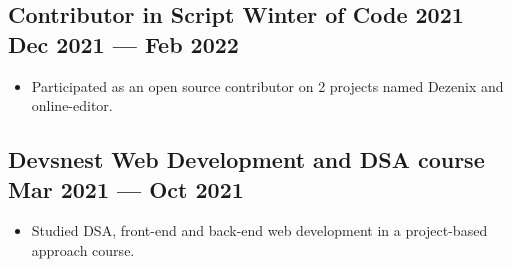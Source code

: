 \documentclass[a4,10pt]{article}
\newenvironment{zitemize}{
\begin{itemize}\itemsep0pt \parskip0pt \parsep1pt}
{\end{itemize}\vspace{-0.5cm}}
\begin{document}
\subsection*{Contributor in Script Winter of Code 2021 \hfill Dec 2021 --- Feb 2022}
\vspace{-0.05cm}
    \begin{zitemize}
    \item Participated as an open source contributor on 2 projects named Dezenix and online-editor.
    \end{zitemize}
\vspace{-0.1cm}
    \subsection*{Devsnest Web Development and DSA course \hfill Mar 2021 --- Oct 2021}
\vspace{-0.05cm}
    \begin{zitemize}
    \item Studied DSA, front-end and back-end web development in a project-based
approach course.
    \end{zitemize}
\end{document}
